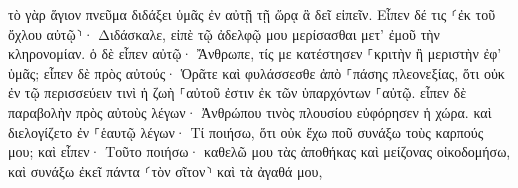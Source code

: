 \documentclass{openreader}
\begin{document}
τὸ γὰρ ἅγιον πνεῦμα διδάξει ὑμᾶς ἐν αὐτῇ τῇ ὥρᾳ ἃ δεῖ εἰπεῖν. 
Εἶπεν δέ τις ⸂ἐκ τοῦ ὄχλου αὐτῷ⸃· Διδάσκαλε, εἰπὲ τῷ ἀδελφῷ μου μερίσασθαι μετ’ ἐμοῦ τὴν κληρονομίαν. 
ὁ δὲ εἶπεν αὐτῷ· Ἄνθρωπε, τίς με κατέστησεν ⸀κριτὴν ἢ μεριστὴν ἐφ’ ὑμᾶς; 
εἶπεν δὲ πρὸς αὐτούς· Ὁρᾶτε καὶ φυλάσσεσθε ἀπὸ ⸀πάσης πλεονεξίας, ὅτι οὐκ ἐν τῷ περισσεύειν τινὶ ἡ ζωὴ ⸀αὐτοῦ ἐστιν ἐκ τῶν ὑπαρχόντων ⸀αὐτῷ. 
εἶπεν δὲ παραβολὴν πρὸς αὐτοὺς λέγων· Ἀνθρώπου τινὸς πλουσίου εὐφόρησεν ἡ χώρα. 
καὶ διελογίζετο ἐν ⸀ἑαυτῷ λέγων· Τί ποιήσω, ὅτι οὐκ ἔχω ποῦ συνάξω τοὺς καρπούς μου; 
καὶ εἶπεν· Τοῦτο ποιήσω· καθελῶ μου τὰς ἀποθήκας καὶ μείζονας οἰκοδομήσω, καὶ συνάξω ἐκεῖ πάντα ⸂τὸν σῖτον⸃ καὶ τὰ ἀγαθά μου, 
\end{document}
